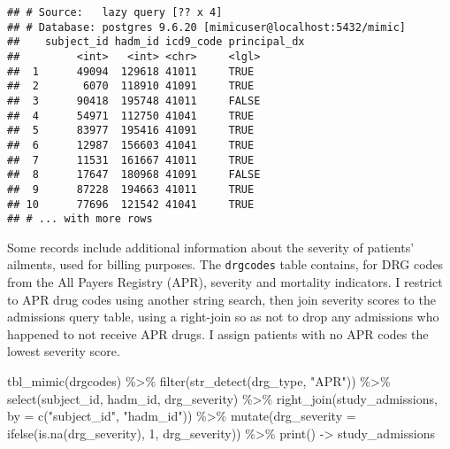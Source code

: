 \documentclass[
]{article}
\newenvironment{Shaded}{\begin{snugshade}}{\end{snugshade}}
\newcommand{\AttributeTok}[1]{\textcolor[rgb]{0.77,0.63,0.00}{#1}}
\newcommand{\DecValTok}[1]{\textcolor[rgb]{0.00,0.00,0.81}{#1}}
\newcommand{\FunctionTok}[1]{\textcolor[rgb]{0.00,0.00,0.00}{#1}}
\newcommand{\NormalTok}[1]{#1}
\newcommand{\OtherTok}[1]{\textcolor[rgb]{0.56,0.35,0.01}{#1}}
\newcommand{\SpecialCharTok}[1]{\textcolor[rgb]{0.00,0.00,0.00}{#1}}
\newcommand{\StringTok}[1]{\textcolor[rgb]{0.31,0.60,0.02}{#1}}
\begin{document}
\begin{verbatim}
## # Source:   lazy query [?? x 4]
## # Database: postgres 9.6.20 [mimicuser@localhost:5432/mimic]
##    subject_id hadm_id icd9_code principal_dx
##         <int>   <int> <chr>     <lgl>       
##  1      49094  129618 41011     TRUE        
##  2       6070  118910 41091     TRUE        
##  3      90418  195748 41011     FALSE       
##  4      54971  112750 41041     TRUE        
##  5      83977  195416 41091     TRUE        
##  6      12987  156603 41041     TRUE        
##  7      11531  161667 41011     TRUE        
##  8      17647  180968 41091     FALSE       
##  9      87228  194663 41011     TRUE        
## 10      77696  121542 41041     TRUE        
## # ... with more rows
\end{verbatim}

Some records include additional information about the severity of
patients' ailments, used for billing purposes. The \texttt{drgcodes}
table contains, for DRG codes from the All Payers Registry (APR),
severity and mortality indicators. I restrict to APR drug codes using
another string search, then join severity scores to the admissions query
table, using a right-join so as not to drop any admissions who happened
to not receive APR drugs. I assign patients with no APR codes the lowest
severity score.

\begin{Shaded}
\begin{Highlighting}[]
\FunctionTok{tbl\_mimic}\NormalTok{(drgcodes) }\SpecialCharTok{\%\textgreater{}\%}
  \FunctionTok{filter}\NormalTok{(}\FunctionTok{str\_detect}\NormalTok{(drg\_type, }\StringTok{"APR"}\NormalTok{)) }\SpecialCharTok{\%\textgreater{}\%}
  \FunctionTok{select}\NormalTok{(subject\_id, hadm\_id, drg\_severity) }\SpecialCharTok{\%\textgreater{}\%}
  \FunctionTok{right\_join}\NormalTok{(study\_admissions, }\AttributeTok{by =} \FunctionTok{c}\NormalTok{(}\StringTok{"subject\_id"}\NormalTok{, }\StringTok{"hadm\_id"}\NormalTok{)) }\SpecialCharTok{\%\textgreater{}\%}
  \FunctionTok{mutate}\NormalTok{(}\AttributeTok{drg\_severity =} \FunctionTok{ifelse}\NormalTok{(}\FunctionTok{is.na}\NormalTok{(drg\_severity), }\DecValTok{1}\NormalTok{, drg\_severity)) }\SpecialCharTok{\%\textgreater{}\%}
  \FunctionTok{print}\NormalTok{() }\OtherTok{{-}\textgreater{}}\NormalTok{ study\_admissions}
\end{Highlighting}
\end{Shaded}
\end{document}
